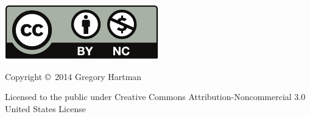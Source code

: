 \noindent\hskip -1in\begin{minipage}{2in}
\includegraphics{text/by-nc} 
\end{minipage}
\begin{minipage}{3in}
\noindent Copyright \copyright\ 2014 Gregory Hartman

Licensed to the public under Creative Commons Attribution-Noncommercial 3.0 United States License
\end{minipage}

